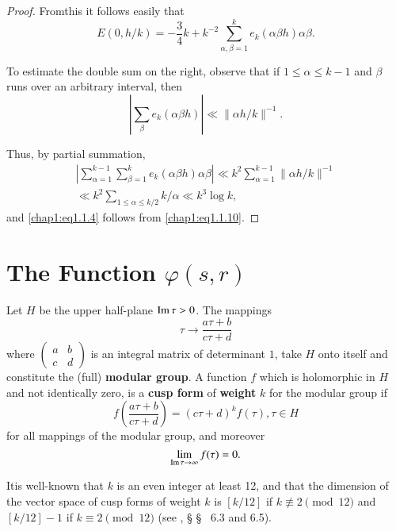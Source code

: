 \begin{proof}
From\pageoriginale this it follows easily that
\begin{equation}\label{chap1:eq1.1.10} 
E(0,h/k) = -\frac{3}{4}k+k^{-2}
\sum\limits_{\alpha,\beta=1}^ke_k(\alpha\beta h)\alpha\beta.
\end{equation}

To estimate the double sum on the right, observe that if $1\leq\alpha
\leq k-1$ and $\beta$ runs over an arbitrary interval, then
$$
\left|\sum\limits_\beta e_k(\alpha\beta h)\right|\ll \parallel\alpha
h/k\parallel^{-1}.
$$

Thus, by partial summation,
\begin{gather*}
\left|\sum\limits_{\alpha=1}^{k-1}\sum\limits_{\beta=1}^k
e_k(\alpha\beta h)\alpha\beta\right|\ll k^2
\sum\limits_{\alpha=1}^{k-1} \parallel\alpha h/k\parallel^{-1}\\
\ll k^2\sum\limits_{1\leq\alpha\leq k/2} k/\alpha \ll k^3\log k,
\end{gather*}
and \eqref{chap1:eq1.1.4} follows from \eqref{chap1:eq1.1.10}.
\end{proof}

\section{The Function $\varphi(s,r)$}\label{chap1:sec1.2}

Let $H$ be the upper half-plane $\operatorname{Im} \tau >0$. The mappings 
$$
\tau\to\frac{a\tau+b}{c\tau+d}
$$
where $\left(\begin{smallmatrix} a & b\\ c &
d \end{smallmatrix}\right)$ is an  integral matrix of determinant $1$,
take $H$ onto itself and constitute the (full) {\bf modular group}. A
function $f$ which is holomorphic in $H$ and not identically zero, is
a {\bf cusp form} of {\bf weight} $k$ for the modular group if 
\begin{equation}\label{chap1:eq1.2.1}
f\left(\frac{a\tau+b}{c\tau+d}\right)=(c\tau+d)^k f(\tau),\tau\in H
\end{equation}
for all mappings of the modular group, and moreover
\begin{equation}\label{chap1:eq1.2.2}
\lim\limits_{\operatorname{Im}\tau \to\infty}f(\tau)=0.
\end{equation}

It\pageoriginale is well-known that $k$ is an even integer at
least 12, and that the dimension of the vector space of cusp forms of
weight $k$ is $[k/12]$ if $k\nequiv 2 \pmod{12}$ and
$[k/12]-1$ if $k \equiv 2 \pmod{12}$ (see \cite{key1}, \S
\S ~ 6.3 and 6.5).

